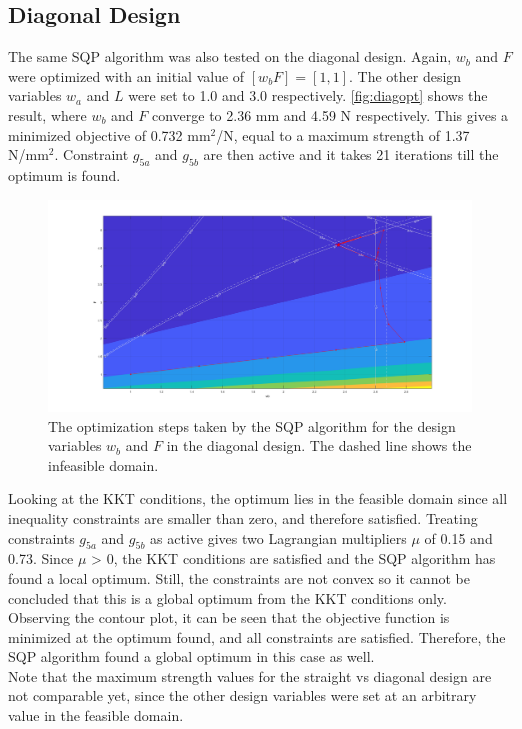 \subsection{Diagonal Design}
The same SQP algorithm was also tested on the diagonal design. Again, $w_b$ and $F$ were optimized with an initial value of $[w_b F] = [1, 1]$. The other design variables $w_a$ and $L$ were set to 1.0 and 3.0 respectively. \autoref{fig:diagopt} shows the result, where $w_b$ and $F$ converge to 2.36 mm and 4.59 N respectively. This gives a minimized objective of 0.732 mm$^2$/N, equal to a maximum strength of 1.37 N/mm$^2$. Constraint $g_{5a}$ and $g_{5b}$ are then active and it takes 21 iterations till the optimum is found.


\begin{figure}[H]
	\centering
	\includegraphics[width=\columnwidth]{sources/plots/diagonal2var.png}
	\caption{The optimization steps taken by the SQP algorithm for the design variables $w_b$ and $F$ in the diagonal design. The dashed line shows the infeasible domain.}
	\label{fig:diagopt}
\end{figure}

Looking at the KKT conditions, the optimum lies in the feasible domain since all inequality constraints are smaller than zero, and therefore satisfied. Treating constraints $g_{5a}$ and $g_{5b}$ as active gives two Lagrangian multipliers $\mu$ of 0.15 and 0.73. Since $\mu$ > 0, the KKT conditions are satisfied and the SQP algorithm has found a local optimum. Still, the constraints are not convex so it cannot be concluded that this is a global optimum from the KKT conditions only. Observing the contour plot, it can be seen that the objective function is minimized at the optimum found, and all constraints are satisfied. Therefore, the SQP algorithm found a global optimum in this case as well.\\

Note that the maximum strength values for the straight vs diagonal design are not comparable yet, since the other design variables were set at an arbitrary value in the feasible domain.








